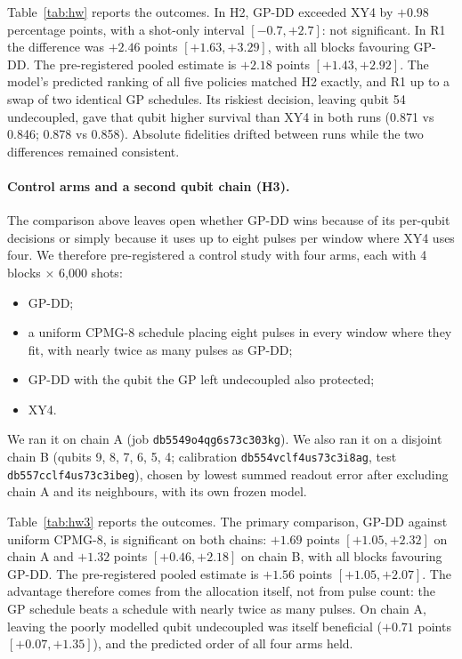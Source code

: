 \documentclass[10pt,letterpaper,journal]{IEEEtran}
\begin{document}


Table~\ref{tab:hw} reports the outcomes. In H2, GP-DD exceeded XY4 by $+0.98$ percentage points, with a shot-only interval $[-0.7,+2.7]$: not significant. In R1 the difference was $+2.46$ points $[+1.63,+3.29]$, with all blocks favouring GP-DD. The pre-registered pooled estimate is $+2.18$ points $[+1.43,+2.92]$. The model's predicted ranking of all five policies matched H2 exactly, and R1 up to a swap of two identical GP schedules. Its riskiest decision, leaving qubit 54 undecoupled, gave that qubit higher survival than XY4 in both runs (0.871 vs 0.846; 0.878 vs 0.858). Absolute fidelities drifted between runs while the two differences remained consistent. \paragraph{Control arms and a second qubit chain (H3).}
The comparison above leaves open whether GP-DD wins because of its per-qubit decisions or simply because it uses up to eight pulses per window where XY4 uses four. We therefore pre-registered a control study with four arms, each with 4 blocks $\times$ 6{,}000 shots:
\begin{itemize}
\item GP-DD;
\item a uniform CPMG-8 schedule placing eight pulses in every window where they fit, with nearly twice as many pulses as GP-DD;
\item GP-DD with the qubit the GP left undecoupled also protected;
\item XY4.
\end{itemize}
We ran it on chain A (job \texttt{db5549o4qg6s73c303kg}). We also ran it on a disjoint chain B (qubits 9, 8, 7, 6, 5, 4; calibration \texttt{db554vclf4us73c3i8ag}, test \texttt{db557cclf4us73c3ibeg}), chosen by lowest summed readout error after excluding chain A and its neighbours, with its own frozen model.

Table~\ref{tab:hw3} reports the outcomes. The primary comparison, GP-DD against uniform CPMG-8, is significant on both chains: $+1.69$ points $[+1.05,+2.32]$ on chain A and $+1.32$ points $[+0.46,+2.18]$ on chain B, with all blocks favouring GP-DD. The pre-registered pooled estimate is $+1.56$ points $[+1.05,+2.07]$. The advantage therefore comes from the allocation itself, not from pulse count: the GP schedule beats a schedule with nearly twice as many pulses. On chain A, leaving the poorly modelled qubit undecoupled was itself beneficial ($+0.71$ points $[+0.07,+1.35]$), and the predicted order of all four arms held.
\end{document}
